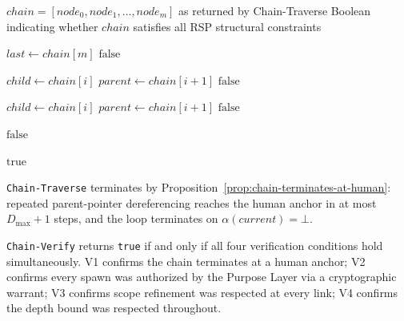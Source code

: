 \begin{algorithm}[H]
\caption{Chain-Verify($chain$): Verify structural validity of a delegation chain}
\label{alg:chain-verify}
\begin{algorithmic}
\REQUIRE $chain = [node_0, node_1, \ldots, node_m]$ as returned by Chain-Traverse
\ENSURE Boolean indicating whether $chain$ satisfies all RSP structural constraints

\STATE {}
\STATE $last \leftarrow chain[m]$
    \STATE \RETURN $\text{false}$ 
\ENDIF

\STATE {}
    \STATE $child \leftarrow chain[i]$
    \STATE $parent \leftarrow chain[i+1]$
        \STATE \RETURN $\text{false}$ 
    \ENDIF
\ENDFOR

\STATE {}
    \STATE $child \leftarrow chain[i]$
    \STATE $parent \leftarrow chain[i+1]$
        \STATE \RETURN $\text{false}$ 
    \ENDIF
\ENDFOR

\STATE {}
        \STATE \RETURN $\text{false}$ 
    \ENDIF
\ENDFOR

\RETURN $\text{true}$
\end{algorithmic}
\end{algorithm}

\texttt{Chain-Traverse} terminates by Proposition~\ref{prop:chain-terminates-at-human}: repeated parent-pointer dereferencing reaches the human anchor in at most $D_{\max} + 1$ steps, and the loop terminates on $\alpha(current) = \bot$.

\texttt{Chain-Verify} returns \texttt{true} if and only if all four verification conditions hold simultaneously. V1 confirms the chain terminates at a human anchor; V2 confirms every spawn was authorized by the Purpose Layer via a cryptographic warrant; V3 confirms scope refinement was respected at every link; V4 confirms the depth bound was respected throughout.

